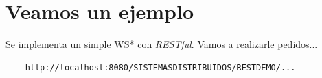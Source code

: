 \documentclass{beamer}
\begin{document}
\appendix{}

\section{Veamos un ejemplo}

\begin{frame}[fragile]{\insertsection{}}
  Se implementa un simple WS* con \emph{RESTful}. Vamos a
  realizarle pedidos...
  \vfill
  
  \begin{lstlisting}
    http://localhost:8080/SISTEMASDISTRIBUIDOS/RESTDEMO/...
  \end{lstlisting}

\end{frame}
\end{document}
